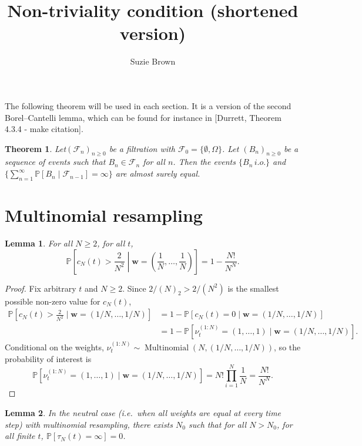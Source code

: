 \documentclass{article}
\title{Non-triviality condition (shortened version)}
\author{Suzie Brown}
\newtheorem{thm}{Theorem}
\newtheorem{lemma}{Lemma}
\newcommand{\PR}{\mathbb{P}}
\newcommand{\Mn}{\operatorname{Multinomial}}
\begin{document}
\maketitle
\thispagestyle{fancy}

The following theorem will be used in each section. It is a version of the second Borel--Cantelli lemma, which can be found for instance in [Durrett, Theorem 4.3.4 - make citation].
\begin{thm}
Let$ (\mathcal{F}_n)_{n\geq 0}$ be a filtration with $\mathcal{F}_0 = \{\emptyset, \Omega\}$. Let $(B_n)_{n\geq 0}$ be a sequence of events such that $B_n \in \mathcal{F}_n$ for all $n$.
Then the events $\{ B_n \, i.o. \}$ and $\{ \sum_{n=1}^\infty \PR[B_n \mid \mathcal{F}_{n-1} ] =\infty \}$ are almost surely equal.
\end{thm}


\section*{Multinomial resampling}

\begin{lemma}\label{lem:neutral_cN_LB}
For all $N\geq 2$, for all $t$,
\begin{equation*}
\PR \left[c_N(t) > \frac{2}{N^2} \middle| \mathbf{w}=\left( \frac{1}{N}, \dots, \frac{1}{N} \right) \right] 
= 1- \frac{N!}{N^N}.
\end{equation*}
\end{lemma}

\begin{proof}
Fix arbitrary $t$ and $N\geq 2$. Since $2/(N)_2 > 2/(N^2)$ is the smallest possible non-zero value for $c_N(t)$,
\begin{align*}
\PR \left[c_N(t) > \frac{2}{N^2} \mid \mathbf{w}=(1/N, \dots, 1/N) \right]
&= 1- \PR[c_N(t) = 0  \mid \mathbf{w}=(1/N, \dots, 1/N)] \\
&= 1- \PR[\nu_t^{(1:N)} = (1,\dots, 1) \mid \mathbf{w}=(1/N, \dots, 1/N)].
\end{align*}
Conditional on the weights, $\nu_t^{(1:N)} \sim \Mn(N, (1/N, \dots, 1/N))$, so the probability of interest is
\begin{equation*}
\PR[\nu_t^{(1:N)} = (1,\dots, 1) \mid \mathbf{w}=(1/N, \dots, 1/N)] =
N! \prod_{i=1}^N \frac{1}{N}
= \frac{N!}{N^N}.
\end{equation*}
\end{proof}


\begin{lemma}\label{thm:nontrivial_mn_optimalw}
In the neutral case (i.e.\ when all weights are equal at every time step) with multinomial resampling, there exists $N_0$ such that for all $N>N_0$, for all finite $t$, $\PR[\tau_N(t) = \infty] =0$.
\end{lemma}
\end{document}
